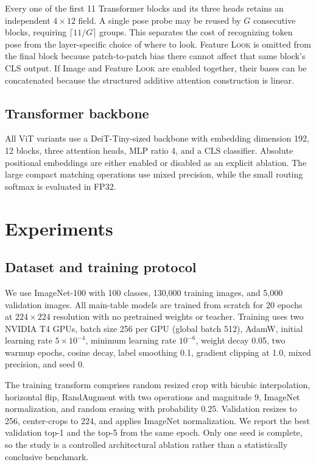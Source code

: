 \documentclass[10pt]{article}
\newcommand{\look}{\textsc{Look}}
\begin{document}
Every one of the first 11 Transformer blocks and its three heads retains an
independent $4\times12$ field. A single pose probe may be reused by $G$
consecutive blocks, requiring $\lceil11/G\rceil$ groups. This separates the
cost of recognizing token pose from the layer-specific choice of where to
look. Feature \look{} is omitted from the final block because patch-to-patch
bias there cannot affect that same block's CLS output. If Image and Feature
\look{} are enabled together, their bases can be concatenated because the
structured additive attention construction is linear.

\subsection{Transformer backbone}

All ViT variants use a DeiT-Tiny-sized backbone with embedding dimension 192,
12 blocks, three attention heads, MLP ratio 4, and a CLS classifier. Absolute
positional embeddings are either enabled or disabled as an explicit ablation.
The large compact matching operations use mixed precision, while the small
routing softmax is evaluated in FP32.

\section{Experiments}

\subsection{Dataset and training protocol}

We use ImageNet-100 with 100 classes, 130,000 training images, and 5,000
validation images. All main-table models are trained from scratch for 20
epochs at $224\times224$ resolution with no pretrained weights or teacher.
Training uses two NVIDIA T4 GPUs, batch size 256 per GPU (global batch 512),
AdamW, initial learning rate $5\times10^{-4}$, minimum learning rate
$10^{-6}$, weight decay 0.05, two warmup epochs, cosine decay, label smoothing
0.1, gradient clipping at 1.0, mixed precision, and seed 0.

The training transform comprises random resized crop with bicubic
interpolation, horizontal flip, RandAugment with two operations and magnitude
9, ImageNet normalization, and random erasing with probability 0.25.
Validation resizes to 256, center-crops to 224, and applies ImageNet
normalization. We report the best validation top-1 and the top-5 from the same
epoch. Only one seed is complete, so the study is a controlled architectural
ablation rather than a statistically conclusive benchmark.
\end{document}
